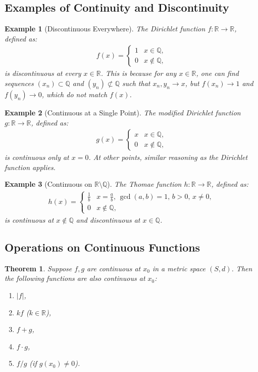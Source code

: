 \documentclass[9pt]{article}
\theoremstyle{definition}
\theoremstyle{plain}
\newtheorem{theorem}{Theorem}
\newtheorem{example}{Example}
\begin{document}
\subsection*{Examples of Continuity and Discontinuity}
\begin{example}[Discontinuous Everywhere]
The Dirichlet function $ f : \mathbb{R} \to \mathbb{R} $, defined as:
\begin{align}
f(x) =
\begin{cases}
1 & x \in \mathbb{Q}, \\
0 & x \notin \mathbb{Q},
\end{cases}
\end{align}
is discontinuous at every $ x \in \mathbb{R} $. This is because for any $ x \in \mathbb{R} $, one can find sequences $ (x_n) \subset \mathbb{Q} $ and $ (y_n) \not\subset \mathbb{Q} $ such that $ x_n, y_n \to x $, but $ f(x_n) \to 1 $ and $ f(y_n) \to 0 $, which do not match $ f(x) $.
\end{example}

\begin{example}[Continuous at a Single Point]
The modified Dirichlet function $ g : \mathbb{R} \to \mathbb{R} $, defined as:
\begin{align}
g(x) =
\begin{cases}
x & x \in \mathbb{Q}, \\
0 & x \notin \mathbb{Q},
\end{cases}
\end{align}
is continuous only at $ x = 0 $. At other points, similar reasoning as the Dirichlet function applies.
\end{example}

\begin{example}[Continuous on $ \mathbb{R} \setminus \mathbb{Q} $]
The Thomae function $ h : \mathbb{R} \to \mathbb{R} $, defined as:
\begin{align}
h(x) =
\begin{cases}
\frac{1}{b} & x = \frac{a}{b}, \, \gcd(a, b) = 1, \, b > 0, \, x \neq 0, \\
0 & x \notin \mathbb{Q},
\end{cases}
\end{align}
is continuous at $ x \notin \mathbb{Q} $ and discontinuous at $ x \in \mathbb{Q} $.
\end{example}

\subsection*{Operations on Continuous Functions}
\begin{theorem}
Suppose $ f, g $ are continuous at $ x_0 $ in a metric space $ (S, d) $. Then the following functions are also continuous at $ x_0 $:
\begin{enumerate}
    \item $ |f| $,
    \item $ kf $ ($ k \in \mathbb{R} $),
    \item $ f + g $,
    \item $ f \cdot g $,
    \item $ f / g $ (if $ g(x_0) \neq 0 $).
\end{enumerate}
\end{theorem}
\end{document}
